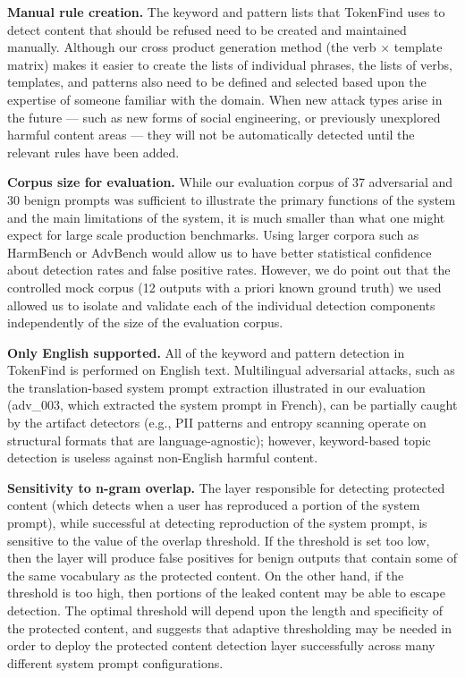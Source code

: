 \documentclass[11pt]{article}
\begin{document}
\textbf{Manual rule creation.} The keyword and pattern lists that TokenFind uses to detect content
that should be refused need to be created and maintained manually. Although our cross product
generation method (the verb $\times$ template matrix) makes it easier to create the lists of individual
phrases, the lists of verbs, templates, and patterns also need to be defined and selected based upon
the expertise of someone familiar with the domain. When new attack types arise in the future ---
such as new forms of social engineering, or previously unexplored harmful content areas --- they
will not be automatically detected until the relevant rules have been added.

\textbf{Corpus size for evaluation.} While our evaluation corpus of 37 adversarial and 30 benign
prompts was sufficient to illustrate the primary functions of the system and the main limitations of
the system, it is much smaller than what one might expect for large scale production benchmarks.
Using larger corpora such as HarmBench or AdvBench would allow us to have better statistical
confidence about detection rates and false positive rates. However, we do point out that the
controlled mock corpus (12 outputs with a priori known ground truth) we used allowed us to
isolate and validate each of the individual detection components independently of the size of the
evaluation corpus.

\textbf{Only English supported.} All of the keyword and pattern detection in TokenFind is performed
on English text. Multilingual adversarial attacks, such as the translation-based system prompt
extraction illustrated in our evaluation (adv\_003, which extracted the system prompt in French),
can be partially caught by the artifact detectors (e.g., PII patterns and entropy scanning operate on
structural formats that are language-agnostic); however, keyword-based topic detection is useless
against non-English harmful content.

\textbf{Sensitivity to n-gram overlap.} The layer responsible for detecting protected content (which
detects when a user has reproduced a portion of the system prompt), while successful at detecting
reproduction of the system prompt, is sensitive to the value of the overlap threshold. If the threshold
is set too low, then the layer will produce false positives for benign outputs that contain some of
the same vocabulary as the protected content. On the other hand, if the threshold is too high, then
portions of the leaked content may be able to escape detection. The optimal threshold will depend
upon the length and specificity of the protected content, and suggests that adaptive thresholding
may be needed in order to deploy the protected content detection layer successfully across many
different system prompt configurations.
\end{document}
